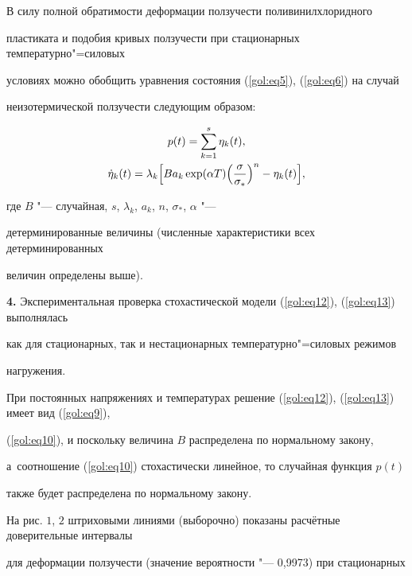 В силу полной обратимости деформации ползучести поливинилхлоридного

пластиката и подобия кривых ползучести при стационарных температурно"=силовых

условиях можно обобщить уравнения состояния (\ref{gol:eq5}), (\ref{gol:eq6}) на случай

неизотермической ползучести следующим образом:

\begin{gather}

\label{gol:eq12}

p( t)=\sum\limits_{k=1}^s \eta _k ( t ) ,

\\

\label{gol:eq13}

\dot \eta _k (t)=\lambda _k

\Bigl[ B a_k \exp (\alpha T )\Bigl( \frac{\sigma }{\sigma _\ast } \Bigr)^n-\eta _k

(t)  \Bigr],

\end{gather}

где $B$ "--- случайная, $s$, $\lambda _k$, $a_k$, $n$, $\sigma _\ast$, $\alpha $ "---

детерминированные величины (численные характеристики всех детерминированных

величин определены выше).



\textbf{4.} Экспериментальная проверка стохастической модели (\ref{gol:eq12}), (\ref{gol:eq13}) выполнялась

как для стационарных, так и нестационарных температурно"=силовых режимов

нагружения.



При постоянных напряжениях и температурах решение (\ref{gol:eq12}), (\ref{gol:eq13}) имеет вид (\ref{gol:eq9}),

(\ref{gol:eq10}), и поскольку величина $B$ распределена по нормальному закону,

а~соотношение (\ref{gol:eq10}) стохастически линейное, то случайная функция $p(t)$

также будет распределена по нормальному закону.

На рис. $1$, $2$ штриховыми линиями (выборочно) показаны расчётные доверительные интервалы

для деформации ползучести (значение вероятности "--- 0,9973) при стационарных

